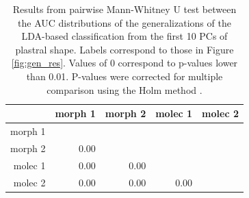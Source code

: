 \documentclass[12pt,letterpaper]{article}\usepackage{graphicx, color}
\begin{document}
\begin{table}
  \centering
\begin{tabular}{r|rrrr}
  & morph 1 & morph 2 & molec 1 & molec 2 \\ 
  \hline
morph 1 &  &  &  &  \\ 
  morph 2 & 0.00 &  &  &  \\ 
  molec 1 & 0.00 & 0.00 &  &  \\ 
  molec 2 & 0.00 & 0.00 & 0.00 &  \\ 
   \hline
\end{tabular}


  \caption{Results from pairwise Mann-Whitney U test between the AUC distributions of the generalizations of the LDA-based classification from the first 10 PCs of plastral shape. Labels correspond to those in Figure \ref{fig:gen_res}. Values of 0 correspond to p-values lower than 0.01. P-values were corrected for multiple comparison using the Holm method \citep{Holm1979}.}
  \label{tab:lda_test}
\end{table}
\end{document}

